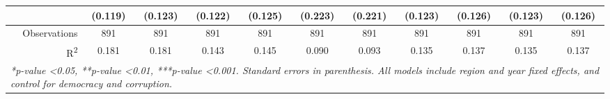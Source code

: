 \documentclass{article}
\begin{document}
\begin{singlespace}
\begin{landscape}
\begin{table}[H]
{\begin{tabular}{rcccccccccc}
					\textit{} & (0.119) & (0.123) & (0.122) & (0.125) & (0.223) & (0.221) & (0.123) & (0.126) & (0.123) & (0.126) \\ \hline
					Observations & 891 & 891 & 891 & 891 & 891 & 891 & 891 & 891 & 891 & 891 \\
					R\textsuperscript{2} & 0.181 & 0.181 & 0.143 & 0.145 & 0.090 & 0.093 & 0.135 & 0.137 & 0.135 & 0.137 \\ \hline
					\multicolumn{11}{l}{\textit{*p-value \textless 0.05, **p-value \textless 0.01, ***p-value \textless 0.001.  Standard errors in parenthesis. All models include region and year fixed effects, and control for democracy and corruption.}}
				\end{tabular}%
			}
		\end{table}
	\end{landscape}
\end{singlespace}		
\end{document}
